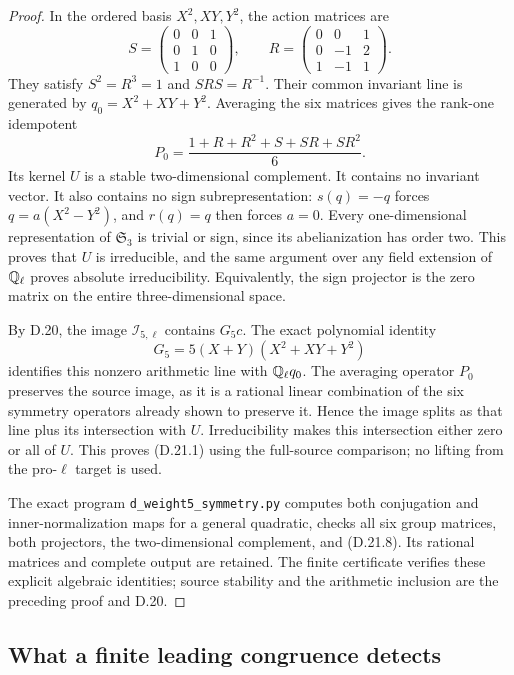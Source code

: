 \begin{proof}
In the ordered basis $X^2,XY,Y^2$, the action matrices are
\[
 S=\begin{pmatrix}0&0&1\\0&1&0\\1&0&0\end{pmatrix},
 \qquad
 R=\begin{pmatrix}0&0&1\\0&-1&2\\1&-1&1\end{pmatrix}.
 \tag{D.21.6}
\]
They satisfy $S^2=R^3=1$ and $SRS=R^{-1}$.
Their common invariant line is generated by
$q_0=X^2+XY+Y^2$. Averaging the six matrices gives the
rank-one idempotent
\[
       P_0=\frac{1+R+R^2+S+SR+SR^2}{6}.
       \tag{D.21.7}
\]
Its kernel $U$ is a stable two-dimensional complement.
It contains no invariant vector. It also contains no
sign subrepresentation: $s(q)=-q$ forces
$q=a(X^2-Y^2)$, and $r(q)=q$ then forces $a=0$.
Every one-dimensional representation of $\mathfrak S_3$
is trivial or sign, since its abelianization has order two.
This proves that $U$ is irreducible, and the same argument
over any field extension of $\mathbb Q_\ell$ proves absolute
irreducibility. Equivalently, the sign projector is the
zero matrix on the entire three-dimensional space.

By D.20, the image $\mathscr I_{5,\ell}$ contains $G_5c$.
The exact polynomial identity
\[
           G_5=5(X+Y)(X^2+XY+Y^2)
           \tag{D.21.8}
\]
identifies this nonzero arithmetic line with $\mathbb Q_\ell q_0$.
The averaging operator $P_0$ preserves the source image,
as it is a rational linear combination of the six symmetry
operators already shown to preserve it. Hence the image
splits as that line plus its intersection with $U$.
Irreducibility makes this intersection either zero or all
of $U$. This proves (D.21.1) using the full-source
comparison; no lifting from the pro-$\ell$ target is used.

The exact program \texttt{d\_weight5\_symmetry.py} computes
both conjugation and inner-normalization maps for a general
quadratic, checks all six group matrices, both projectors,
the two-dimensional complement, and (D.21.8). Its rational
matrices and complete output are retained. The finite
certificate verifies these explicit algebraic identities;
source stability and the arithmetic inclusion are the
preceding proof and D.20.
\end{proof}

\subsection{What a finite leading congruence detects}

